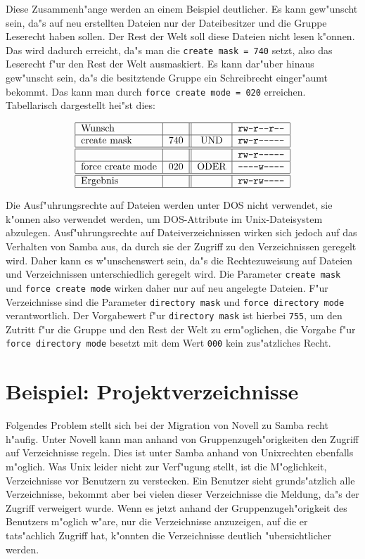\documentclass{scrartcl}
\newcommand{\param}{\texttt}
\begin{document}
Diese Zusammenh"ange werden an einem Beispiel deutlicher. Es kann
gew"unscht sein, da"s auf neu erstellten Dateien nur der
Dateibesitzer und die Gruppe Leserecht haben sollen. Der Rest der Welt
soll diese Dateien nicht lesen k"onnen. Das wird dadurch erreicht,
da"s man die \param{create mask = 740} setzt, also das Leserecht f"ur
den Rest der Welt ausmaskiert. Es kann dar"uber hinaus gew"unscht
sein, da"s die besitztende Gruppe ein Schreibrecht einger"aumt
bekommt. Das kann man durch \param{force create mode = 020} erreichen.
Tabellarisch dargestellt hei"st dies:

\[ \begin{tabular}{|l|l||c|l|}
\hline
Wunsch & & & \texttt{rw-r-{}-r-{}-} \\
\hline
create mask & 740 & UND & \texttt{rw-r-{}-{}-{}-{}-} \\
\hline
\hline
& & & \texttt{rw-r-{}-{}-{}-{}-} \\
\hline
force create mode & 020 & ODER & \texttt{-{}-{}-{}-w-{}-{}-{}-} \\
\hline
\hline
Ergebnis & & & \texttt{rw-rw-{}-{}-{}-} \\
\hline
\end{tabular} \]

Die Ausf"uhrungsrechte auf Dateien werden unter DOS nicht verwendet,
sie k"onnen also verwendet werden, um DOS-Attribute im
Unix-Dateisystem abzulegen. Ausf"uhrungsrechte auf Dateiverzeichnissen
wirken sich jedoch auf das Verhalten von Samba aus, da durch sie der
Zugriff zu den Verzeichnissen geregelt wird.  Daher kann es
w"unschenswert sein, da"s die Rechtezuweisung auf Dateien und
Verzeichnissen unterschiedlich geregelt wird. Die Parameter
\param{create mask} und \param{force create mode} wirken daher nur auf
neu angelegte Dateien.  F"ur Verzeichnisse sind die Parameter
\param{directory mask} und \param{force directory mode}
verantwortlich. Der Vorgabewert f"ur \param{directory mask} ist
hierbei \param{755}, um den Zutritt f"ur die Gruppe und den Rest der
Welt zu erm"oglichen, die Vorgabe f"ur \param{force directory mode}
besetzt mit dem Wert \param{000} kein zus"atzliches Recht.

\section{Beispiel: Projektverzeichnisse}

Folgendes Problem stellt sich bei der Migration von Novell zu Samba
recht h"aufig. Unter Novell kann man anhand von
Gruppenzugeh"origkeiten den Zugriff auf Verzeichnisse regeln. Dies ist
unter Samba anhand von Unixrechten ebenfalls m"oglich. Was Unix leider
nicht zur Verf"ugung stellt, ist die M"oglichkeit, Verzeichnisse vor
Benutzern zu verstecken. Ein Benutzer sieht grunds"atzlich alle
Verzeichnisse, bekommt aber bei vielen dieser Verzeichnisse die
Meldung, da"s der Zugriff verweigert wurde. Wenn es jetzt anhand der
Gruppenzugeh"origkeit des Benutzers m"oglich w"are, nur die
Verzeichnisse anzuzeigen, auf die er tats"achlich Zugriff hat,
k"onnten die Verzeichnisse deutlich "ubersichtlicher werden.
\end{document}
